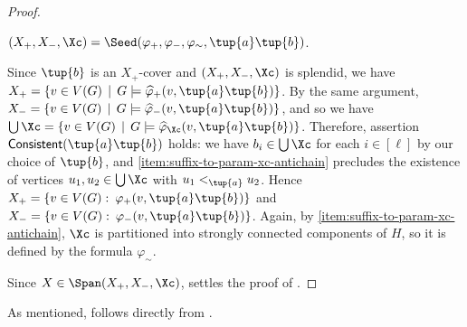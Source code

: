 \begin{proof}
    \begin{claim}
        \label{cl:span-verification}
        $(X_+, X_-, \Xc) = \Seed(\varphi_+, \varphi_-, \varphi_\sim, \tup{a}\tup{b})$.
    \end{claim}
    \begin{claimproof}
        Since $\tup{b}$ is an $X_+$-cover and $(X_+, X_-, \Xc)$ is splendid, we have $X_+ = \{v \in V(G) \,\mid\, G\models \widehat{\varphi}_+(v, \tup{a}\tup{b})\}$.
        By the same argument, $X_- = \{v \in V(G) \,\mid\, G\models \widehat{\varphi}_-(v, \tup{a}\tup{b})\}$, and so we have $\bigcup\Xc = \{v \in V(G) \,\mid\, G\models \widehat{\varphi}_\Xc(v, \tup{a}\tup{b})\}$.
        Therefore, assertion $\IsConsistent(\tup{a}\tup{b})$ holds: we have $b_i \in \bigcup \Xc$ for each $i \in [\ell]$ by our choice of $\tup{b}$, and \ref{item:suffix-to-param-xc-antichain} precludes the existence of vertices $u_1, u_2 \in \bigcup \Xc$ with $u_1 <_{\tup{a}} u_2$.
        Hence $X_+ = \{v \in V(G) \,\colon\, \varphi_+(v, \tup{a}\tup{b})\}$ and $X_- = \{v \in V(G) \,\colon\, \varphi_-(v, \tup{a}\tup{b})\}$.
        Again, by \ref{item:suffix-to-param-xc-antichain}, $\Xc$ is partitioned into strongly connected components of $H$, so it is defined by the formula $\varphi_\sim$.
    \end{claimproof}

    Since $X \in \Span(X_+, X_-, \Xc)$,  settles the proof of .
\end{proof}

As mentioned,  follows directly from .
